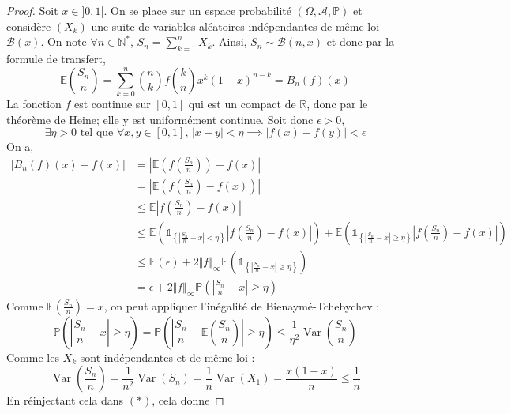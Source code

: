 	\begin{proof}
		Soit $x \in ]0, 1[$. On se place sur un espace probabilité $(\Omega, \mathcal{A}, \mathbb{P})$ et considère $(X_k)$ une suite de variables aléatoires indépendantes de même loi $\mathcal{B}(x)$. On note $\forall n \in \mathbb{N}^*$, $S_n = \sum_{k=1}^n X_k$. Ainsi, $S_n \sim \mathcal{B}(n, x)$ et donc par la formule de transfert,
		\[ \mathbb{E} \left( \frac{S_n}{n} \right) = \sum_{k=0}^n \binom{n}{k} f \left( \frac{k}{n} \right) x^k (1-x)^{n-k} = B_n(f)(x) \]
		La fonction $f$ est continue sur $[0,1]$ qui est un compact de $\mathbb{R}$, donc par le théorème de Heine; elle y est uniformément continue. Soit donc $\epsilon > 0$,
		\[ \exists \eta > 0 \text{ tel que } \forall x, y \in [0,1], \, |x-y| < \eta \implies |f(x) - f(y)| < \epsilon \]
		On a,
		\begin{align*}
			|B_n(f)(x) - f(x)| &= \left| \mathbb{E} \left( f \left( \frac{S_n}{n} \right) \right) - f(x) \right| \\
			&= \left| \mathbb{E} \left( f \left( \frac{S_n}{n} \right) - f(x) \right) \right| \\
			&\leq \mathbb{E} \left| f \left( \frac{S_n}{n} \right) - f(x) \right| \\
			&\leq \mathbb{E} \left( \mathbb{1}_{\left \{ \left| \frac{S_n}{n} - x \right| < \eta \right \}} \left| f \left( \frac{S_n}{n} \right) - f(x) \right| \right) + \mathbb{E} \left( \mathbb{1}_{\left \{ \left| \frac{S_n}{n} - x \right| \geq \eta \right \}} \left| f \left( \frac{S_n}{n} \right) - f(x) \right| \right) \\
			&\leq \mathbb{E} (\epsilon) + 2 \Vert f \Vert_\infty \mathbb{E} \left( \mathbb{1}_{\left \{ \left| \frac{S_n}{n} - x \right| \geq \eta \right \}} \right) \\
			&= \epsilon + 2 \Vert f \Vert_\infty \mathbb{P} \left( \left| \frac{S_n}{n} - x \right| \geq \eta \right) \tag{$*$}
		\end{align*}
		Comme $\mathbb{E} \left( \frac{S_n}{n} \right) = x$, on peut appliquer l'inégalité de Bienaymé-Tchebychev :
		\[ \mathbb{P} \left( \left| \frac{S_n}{n} - x \right| \geq \eta \right) = \mathbb{P} \left( \left| \frac{S_n}{n} - \mathbb{E} \left( \frac{S_n}{n} \right) \right| \geq \eta \right) \leq \frac{1}{\eta^2} \operatorname{Var} \left( \frac{S_n}{n} \right) \]
		Comme les $X_k$ sont indépendantes et de même loi :
		\[ \operatorname{Var} \left( \frac{S_n}{n} \right) = \frac{1}{n^2} \operatorname{Var} (S_n) = \frac{1}{n} \operatorname{Var}(X_1) = \frac{x(1-x)}{n} \leq \frac{1}{n} \]
		En réinjectant cela dans $(*)$, cela donne

\end{proof}
